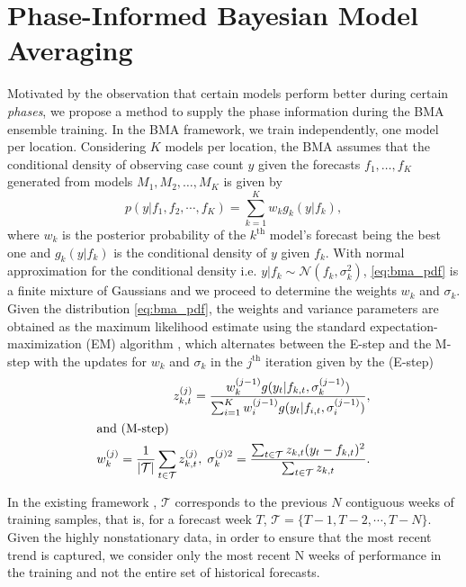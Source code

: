 \documentclass[conference,compsoc]{IEEEtran}
\begin{document}
\section{Phase-Informed Bayesian Model Averaging}\label{sec:PIBMA}
Motivated by the observation that certain models perform better during certain \emph{phases}, we propose a method to supply the phase information during the BMA ensemble training. In the BMA framework, we train independently, one model per location. Considering $K$ models per location, the BMA assumes that the conditional density of observing case count $y$ given the forecasts $f_1, \dots, f_K$ generated from  models $M_1, M_2, \dots, M_K$ is given by 
\begin{equation}
    p(y| f_1, f_2, \cdots, f_K) = \sum_{k=1}^{K} w_k g_k (y|f_k),
    \label{eq:bma_pdf}
\end{equation}
where $w_k$ is the posterior probability of the $k^{\mathrm{th}}$ model's forecast being the best one and $g_k(y|f_k)$ is the conditional density of $y$ given $f_k$. With normal approximation for the conditional density i.e. $y|f_k \sim \mathcal{N}(f_k,\sigma^2_k)$, \eqref{eq:bma_pdf} is a finite mixture of Gaussians and we proceed to determine the weights $w_k$ and $\sigma_k$. Given the distribution \eqref{eq:bma_pdf}, the weights and variance parameters are obtained as the maximum likelihood estimate using the standard expectation-maximization (EM) algorithm \cite{raftery2005using}, which
alternates between the E-step and the M-step with the updates for $w_k$ and $\sigma_k$ in the $j^{\text{th}}$ iteration given by the (E-step)
\begin{align}
    \quad z^{(j)}_{k,t} = \frac{w^{(j-1)}_kg({y_t|f_{k,t}, \sigma_k^{(j-1)}})}{\sum_{i=1}^K w^{(j-1)}_i g(y_t|f_{i,t}, \sigma_i^{(j-1)})}, \nonumber\\ \intertext{and (M-step)}
     w^{(j)}_k = \frac{1}{|\mathcal{T}|} \sum_{t \in \mathcal{T}} z_{k,t}^{(j)}, \; \sigma^{(j)2}_k = \frac{\sum_{t \in \mathcal{T}}z_{k,t}(y_t-f_{k,t})^2}{\sum_{t \in \mathcal{T}}z_{k,t}  }.
    \label{eq:bma_fixed}
\end{align}

 In the existing framework \cite{allmodels}, $\mathcal{T}$ corresponds to the previous $N$ contiguous weeks of training samples, that is, for a forecast week $T$, $\mathcal{T}=\{T-1, T-2, \cdots, T-N\}$. Given the highly nonstationary data, in order to ensure that the most recent trend is captured, we consider only the most recent N weeks of performance in the training and not the entire set of historical forecasts. 
\end{document}
